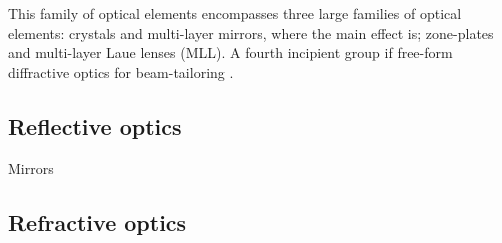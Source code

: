 \begin{refsection}
This family of optical elements encompasses three large families of optical elements: crystals and multi-layer mirrors, where the main effect is; zone-plates and multi-layer Laue lenses (MLL). A fourth incipient group if free-form diffractive optics for beam-tailoring . 

\subsection{Reflective optics}\label{sec:reflec}
Mirrors 

\subsection{Refractive optics}


\end{refsection}
